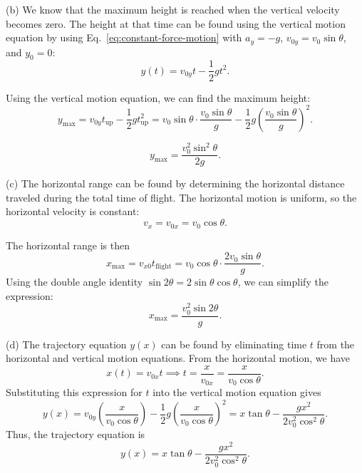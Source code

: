 \documentclass[../main.tex]{subfiles}
\begin{document}
(b) We know that the maximum height is reached when the vertical velocity becomes zero. The height at that time can be found using the vertical motion equation by using Eq.~\eqref{eq:constant-force-motion} with $a_y = -g$, $v_{0y} = v_0 \sin \theta$, and $y_0 = 0$:
\begin{equation}
y(t) = v_{0y} t - \frac{1}{2} g t^2.
\end{equation}


Using the vertical motion equation, we can find the maximum height:
\begin{equation}
y_{\text{max}} = v_{0y} t_{\text{up}} - \frac{1}{2} g t_{\text{up}}^2 = v_0 \sin \theta \cdot \frac{v_0 \sin \theta}{g} - \frac{1}{2} g \left(\frac{v_0 \sin \theta}{g}\right)^2.
\end{equation}

\begin{equation}
    \boxed{
y_{\text{max}} = \frac{v_0^2 \sin^2 \theta}{2g}}.
\end{equation}

(c) The horizontal range can be found by determining the horizontal distance traveled during the total time of flight. The horizontal motion is uniform, so the horizontal velocity is constant:
\begin{equation}
v_x = v_{0x} = v_0 \cos \theta.
\end{equation}

The horizontal range is then
\begin{equation}
    x_{\text{max}} = v_{x0} t_{\text{flight}} = v_0 \cos \theta \cdot \frac{2 v_0 \sin \theta}{g}.
\end{equation}
Using the double angle identity $\sin 2\theta = 2 \sin \theta \cos \theta$, we can simplify the expression:
\begin{equation}
    \boxed{x_{\text{max}} = \frac{v_0^2 \sin 2\theta}{g}}.
\end{equation}

(d) The trajectory equation $y(x)$ can be found by eliminating time $t$ from the horizontal and vertical motion equations. From the horizontal motion, we have
\begin{equation}
x(t) = v_{0x} t \implies t = \frac{x}{v_{0x}} = \frac{x}{v_0 \cos \theta}.
\end{equation}
Substituting this expression for $t$ into the vertical motion equation gives
\begin{equation}
y(x) = v_{0y} \left(\frac{x}{v_0 \cos \theta}\right) - \frac{1}{2} g \left(\frac{x}{v_0 \cos \theta}\right)^2 = x \tan \theta - \frac{g x^2}{2 v_0^2 \cos^2 \theta}.
\end{equation}
Thus, the trajectory equation is
\begin{equation}
    \boxed{y(x) = x \tan \theta - \frac{g x^2}{2 v_0^2 \cos^2 \theta}}.
\end{equation}
\end{document}
